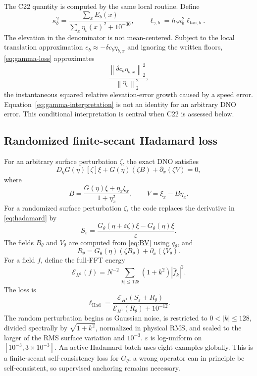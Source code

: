 \documentclass[11pt]{article}
\newcommand{\norm}[1]{\left\lVert #1\right\rVert}
\begin{document}
The C22 quantity is computed by the same local routine.  Define
\begin{equation}
  \kappa_b^2
  =\frac{\sum_xE_b(x)}{\sum_x\eta_b(x)^2+10^{-30}},
  \qquad
  \ell_{\gamma,b}=h_b\kappa_b^2\ell_{\mathrm{tan},b}.
  \label{eq:gamma-loss}
\end{equation}
The elevation in the denominator is not mean-centered.  Subject to the local
translation approximation $e_b\approx-\delta c_b\eta_{b,x}$ and ignoring the
written floors, \eqref{eq:gamma-loss} approximates
\begin{equation}
  \frac{\norm{\delta c_b\eta_{b,x}}_2^2}{\norm{\eta_b}_2^2},
  \label{eq:gamma-interpretation}
\end{equation}
the instantaneous squared relative elevation-error growth caused by a speed
error.  Equation~\eqref{eq:gamma-interpretation} is not an identity for an
arbitrary DNO error.  This conditional interpretation is central when C22 is
assessed below.

\subsection{Randomized finite-secant Hadamard loss}

For an arbitrary surface perturbation $\zeta$, the exact DNO satisfies
\begin{equation}
  D_\eta G(\eta)[\zeta]\xi
  +G(\eta)(\zeta B)+\partial_x(\zeta V)=0,
  \label{eq:hadamard}
\end{equation}
where
\begin{equation}
  B=\frac{G(\eta)\xi+\eta_x\xi_x}{1+\eta_x^2},
  \qquad
  V=\xi_x-B\eta_x.
  \label{eq:BV}
\end{equation}
For a randomized surface perturbation $\zeta$, the code replaces the
derivative in \eqref{eq:hadamard} by
\begin{equation}
  S_\varepsilon
  =\frac{G_\theta(\eta+\varepsilon\zeta)\xi
  -G_\theta(\eta)\xi}{\varepsilon}.
  \label{eq:had-secant}
\end{equation}
The fields $B_\theta$ and $V_\theta$ are computed from \eqref{eq:BV} using
$q_\theta$, and
\begin{equation}
  R_\theta=G_\theta(\eta)(\zeta B_\theta)
  +\partial_x(\zeta V_\theta).
\end{equation}
For a field $f$, define the full-FFT energy
\begin{equation}
  \mathcal E_{H^1}(f)
  =N^{-2}\sum_{|k|\leq128}(1+k^2)|\widehat f_k|^2.
\end{equation}
The loss is
\begin{equation}
  \ell_{\mathrm{Had}}
  =\frac{\mathcal E_{H^1}(S_\varepsilon+R_\theta)}
  {\mathcal E_{H^1}(R_\theta)+10^{-12}}.
  \label{eq:had-loss}
\end{equation}
The random perturbation begins as Gaussian noise, is restricted to
$0<|k|\leq128$, divided spectrally by $\sqrt{1+k^2}$, normalized in physical
RMS, and scaled to the larger of the RMS surface variation and $10^{-3}$.
$\varepsilon$ is log-uniform on $[10^{-3},3\times10^{-3}]$.  An active
Hadamard batch uses eight examples globally.  This is a finite-secant
self-consistency loss for $G_\theta$; a wrong operator can in principle be
self-consistent, so supervised anchoring remains necessary.
\end{document}
